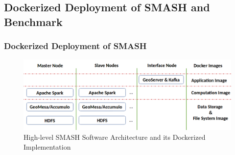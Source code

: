 \subsection{Dockerized Deployment of SMASH and Benchmark}
\begin{frame}
    \frametitle{Dockerized Deployment of SMASH}
    \begin{figure}
        \centering
        \includegraphics[width=\linewidth]{resource/figures/smash-docker.png}
        \caption{High-level SMASH Software Architecture and its Dockerized Implementation}
    \end{figure}
\end{frame}

